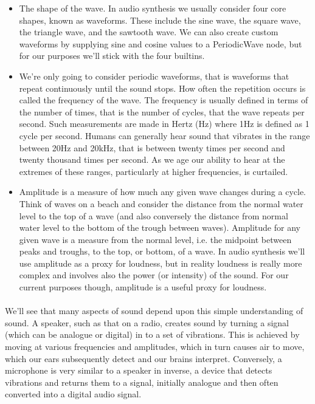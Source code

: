 \begin{itemize}
\item The shape of the wave. In audio synthesis we usually consider four core shapes, known as waveforms. These include the sine wave, the square wave, the triangle wave, and the sawtooth wave. We can also create custom waveforms by supplying sine and cosine values to a PeriodicWave node, but for our purposes we'll stick with the four builtins.
\item We're only going to consider periodic waveforms, that is waveforms that repeat continuously until the sound stops. How often the repetition occurs is called the frequency of the wave. The frequency is usually defined in terms of the number of times, that is the number of cycles, that the wave repeats per second. Such measurements are made in Hertz (Hz) where 1Hz is defined as 1 cycle per second. Humans can generally hear sound that vibrates in the range between 20Hz and 20kHz, that is between twenty times per second and twenty thousand times per second. As we age our ability to hear at the extremes of these ranges, particularly at higher frequencies, is curtailed.
\item Amplitude is a measure of how much any given wave changes during a cycle. Think of waves on a beach and consider the distance from the normal water level to the top of a wave (and also conversely the distance from normal water level to the bottom of the trough between waves). Amplitude for any given wave is a measure from the normal level, i.e. the midpoint between peaks and troughs, to the top, or bottom, of a wave. In audio synthesis we'll use amplitude as a proxy for loudness, but in reality loudness is really more complex and involves also the power (or intensity) of the sound. For our current purposes though, amplitude is a useful proxy for loudness.
\end{itemize}

\paragraph{} We'll see that many aspects of sound depend upon this simple understanding of sound. A speaker, such as that on a radio, creates sound by turning a signal (which can be analogue or digital) in to a set of vibrations. This is achieved by moving at various frequencies and amplitudes, which in turn causes air to move, which our ears subsequently detect and our brains interpret. Conversely, a microphone is very similar to a speaker in inverse, a device that detects vibrations and returns them to a signal, initially analogue and then often converted into a digital audio signal. 
